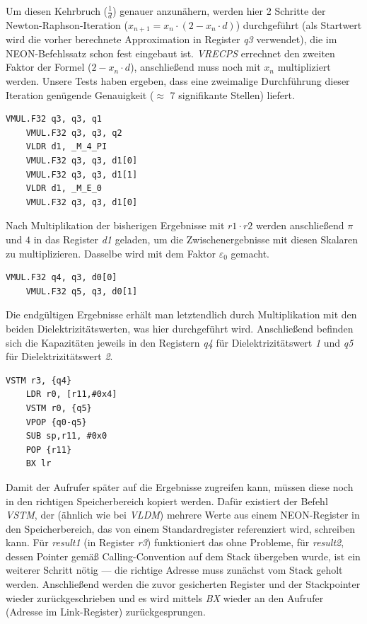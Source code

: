 \documentclass[11pt]{scrartcl}
\begin{document}
Um diesen Kehrbruch ($\frac{1}{d}$) genauer anzunähern, werden hier 2 Schritte der Newton-Raphson-Iteration ($x_{n+1}=x_{n} \cdot (2 - x_{n} \cdot d)$) durchgeführt (als Startwert wird die vorher berechnete Approximation in Register \emph{q3} verwendet), die im NEON-Befehlssatz schon fest eingebaut ist. \emph{VRECPS} errechnet den zweiten Faktor der Formel ($2 - x_{n} \cdot d$), anschließend muss noch mit $x_{n}$ multipliziert werden. Unsere Tests haben ergeben, dass eine zweimalige Durchführung dieser Iteration genügende Genauigkeit ($\approx$ 7 signifikante Stellen) liefert.
\\
\begin{lstlisting}[language={[x86masm]Assembler}]
	VMUL.F32 q3, q3, q1
	VMUL.F32 q3, q3, q2
	VLDR d1, _M_4_PI
	VMUL.F32 q3, q3, d1[0]
	VMUL.F32 q3, q3, d1[1]
	VLDR d1, _M_E_0
	VMUL.F32 q3, q3, d1[0]
\end{lstlisting}
Nach Multiplikation der bisherigen Ergebnisse mit $r1 \cdot r2$ werden anschließend $\pi$ und $4$ in das Register \emph{d1} geladen, um die Zwischenergebnisse mit diesen Skalaren zu multiplizieren. Dasselbe wird mit dem Faktor $\varepsilon_{0}$ gemacht.
\\
\begin{lstlisting}[language={[x86masm]Assembler}]
	VMUL.F32 q4, q3, d0[0]
	VMUL.F32 q5, q3, d0[1]
\end{lstlisting}
Die endgültigen Ergebnisse erhält man letztendlich durch Multiplikation mit den beiden Dielektrizitätswerten, was hier durchgeführt wird. Anschließend befinden sich die Kapazitäten jeweils in den Registern \emph{q4} für Dielektrizitätswert \emph{1} und \emph{q5} für Dielektrizitätswert \emph{2}.
\\
\begin{lstlisting}[language={[x86masm]Assembler}]
	VSTM r3, {q4}
	LDR r0, [r11,#0x4]
	VSTM r0, {q5}
	VPOP {q0-q5}
	SUB sp,r11, #0x0
	POP {r11}
	BX lr
\end{lstlisting}
Damit der Aufrufer später auf die Ergebnisse zugreifen kann, müssen diese noch in den richtigen Speicherbereich kopiert werden. Dafür existiert der Befehl \emph{VSTM}, der (ähnlich wie bei \emph{VLDM}) mehrere Werte aus einem NEON-Register in den Speicherbereich, das von einem Standardregister referenziert wird, schreiben kann. Für \emph{result1} (in Register \emph{r3}) funktioniert das ohne Probleme, für \emph{result2}, dessen Pointer gemäß Calling-Convention auf dem Stack übergeben wurde, ist ein weiterer Schritt nötig --- die richtige Adresse muss zunächst vom Stack geholt werden. Anschließend werden die zuvor gesicherten Register und der Stackpointer wieder zurückgeschrieben und es wird mittels \emph{BX} wieder an den Aufrufer (Adresse im Link-Register) zurückgesprungen.
\end{document}
